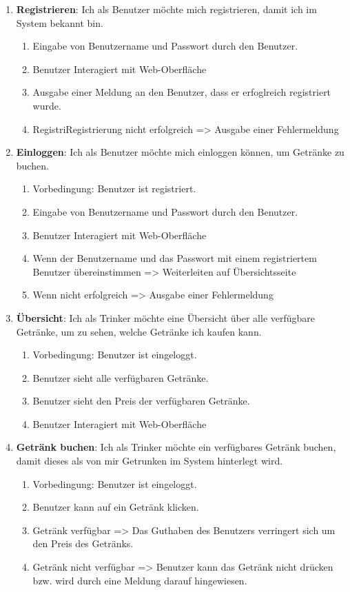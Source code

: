 \documentclass[conference,a4paper]{cs-techrep}
\begin{document}
\begin{enumerate}[{USM}1]
	
\item \textbf{Registrieren}: Ich als Benutzer möchte mich registrieren, damit ich im System bekannt bin.
	\begin{enumerate}
	\item Eingabe von Benutzername und Passwort durch den Benutzer.
	\item Benutzer Interagiert mit Web-Oberfläche
	\item Ausgabe einer Meldung an den Benutzer, dass er erfoglreich registriert wurde.
	\item RegistriRegistrierung  nicht erfolgreich => Ausgabe einer Fehlermeldung
	\end{enumerate}

\item \textbf{Einloggen}: Ich als Benutzer möchte mich einloggen können, um Getränke zu buchen.
\begin{enumerate}
	\item Vorbedingung: Benutzer ist registriert.
	\item Eingabe von Benutzername und Passwort durch den Benutzer.
	\item Benutzer Interagiert mit Web-Oberfläche
	\item Wenn der Benutzername und das Passwort mit einem registriertem Benutzer übereinstimmen => Weiterleiten auf Übersichtsseite
	\item Wenn nicht erfolgreich => Ausgabe einer Fehlermeldung
\end{enumerate}

\item \textbf{Übersicht}: Ich als Trinker möchte eine Übersicht über alle verfügbare Getränke, um zu sehen, welche Getränke ich kaufen kann.
\begin{enumerate}
	\item Vorbedingung: Benutzer ist eingeloggt.
	\item Benutzer sieht alle verfügbaren Getränke.
	\item Benutzer sieht den Preis der verfügbaren Getränke.
	\item Benutzer Interagiert mit Web-Oberfläche
\end{enumerate}

\item \textbf{Getränk buchen}: Ich als Trinker möchte ein verfügbares Getränk buchen, damit dieses als von mir Getrunken im System hinterlegt wird.
\begin{enumerate}
	\item Vorbedingung: Benutzer ist eingeloggt.
	\item Benutzer kann auf ein Getränk klicken.
	\item Getränk verfügbar => Das Guthaben des Benutzers verringert sich um den Preis des Getränks.
	\item Getränk nicht verfügbar => Benutzer kann das Getränk nicht drücken bzw. wird durch eine Meldung darauf hingewiesen.
\end{enumerate}


\end{enumerate}
\end{document}
